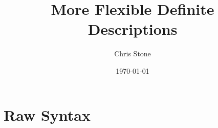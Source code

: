 \documentclass[10pt,a4paper]{article}
\begin{document}
\title{More Flexible Definite Descriptions}
\author{Chris Stone}
\date{\today}
\maketitle


\section{Raw Syntax}

\newcommand{\I}{I}

\renewcommand{\t}{t}
\renewcommand{\u}{u}
\newcommand{\f}{f}
\newcommand{\x}{x}
\newcommand{\y}{y}
\newcommand{\tFun}[3]{#1({#2}_1,\ldots,{#2}_{#3})}
\newcommand{\tDesc}[3]{\rotatebox[origin=c]{180}{$\iota$} #1.\, #3}


\newcommand{\p}{P}
\newcommand{\q}{Q}
\renewcommand{\r}{R}

\newcommand{\pTrue}{\top}
\newcommand{\pFalse}{\bot}
\newcommand{\pExists}[3]{\exists #1.\, #3}
\newcommand{\pForall}[3]{\forall #1.\, #3}
\newcommand{\pAnd}[2]{#1 \wedge #2}
\newcommand{\pOr}[2]{#1 \vee #2}
\newcommand{\pImply}[2]{#1 \Rightarrow #2}
\newcommand{\pEqual}[2]{#1 = #2}
\newcommand{\pIff}[2]{#1 \Longleftrightarrow #2}

\newcommand{\G}{\Gamma}
\newcommand{\D}{\Delta}
\newcommand{\emptyCtx}{\cdot}

\renewcommand{\wp}[1]{\mathop{\mathsf{WP}}(#1)}
\newcommand{\jwp}[1]{\mathop{\mathsf{wp}}(#1)}
\newcommand{\trans}[1]{\ulcorner #1 \urcorner}
\newcommand{\jtrans}[1]{\llcorner #1 \lrcorner}

\newcommand{\jwfterm}[4]{#1;#2 \vdash #3\, :\, #4}
\newcommand{\jwfprop}[3]{#1;#2 \vdash #3\, :\, \mathsf{Prop}}
\newcommand{\jpf}[3]{#1;#2 \vdash #3}

\newcommand{\wfterm}[4]{#1;#2 \,\triangleright\, #3\, :\, #4}
\newcommand{\wfprop}[3]{#1;#2 \,\triangleright\, #3\,:\, \mathsf{Prop}}
\newcommand{\pf}[3]{#1;#2 \,\triangleright\, #3}

\newcommand{\subst}[3]{#1[#2{\mapsto}#3]}
\end{document}
